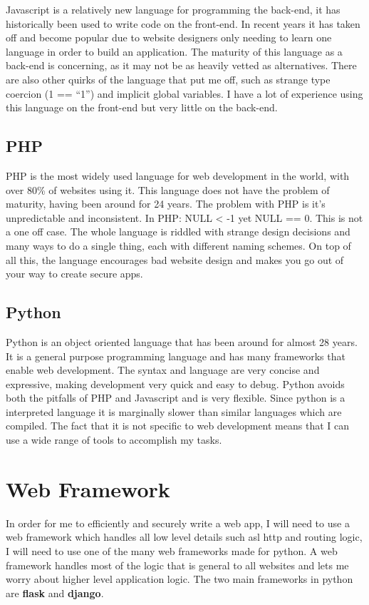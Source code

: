 \documentclass[a4paper,oneside,12pt,draft]{report}
\begin{document}
	Javascript is a relatively new language for programming the back-end, it has historically been used to write code on the front-end. In recent years it has taken off and become popular due to website designers only needing to learn one language in order to build an application. The maturity of this language as a back-end is concerning, as it may not be as heavily vetted as alternatives. There are also other quirks of the language that put me off, such as strange type coercion (1 == “1”) and implicit global variables. I have a lot of experience using this language on the front-end but very little on the back-end.

	\subsection{PHP}
	PHP is the most widely used language for web development in the world, with over 80\% of websites using it. This language does not have the problem of maturity, having been around for 24 years. The problem with PHP is it’s unpredictable and inconsistent. In PHP: NULL < -1 yet NULL == 0. This is not a one off case. The whole language is riddled with strange design decisions and many ways to do a single thing, each with different naming schemes. On top of all this, the language encourages bad website design and makes you go out of your way to create secure apps.

	\subsection{Python}
	Python is an object oriented language that has been around for almost 28 years. It is a general purpose programming language and has many frameworks that enable web development. The syntax and language are very concise and expressive, making development very quick and easy to debug. Python avoids both the pitfalls of PHP and Javascript and is very flexible. Since python is a interpreted language it is marginally slower than similar languages which are compiled. The fact that it is not specific to web development means that I can use a wide range of tools to accomplish my tasks.

	\section{Web Framework}
	In order for me to efficiently and securely write a web app, I will need to use a web framework which handles all low level details such asl http and routing logic, I will need to use one of the many web frameworks made for python. A web framework handles most of the logic that is general to all websites and lets me worry about higher level application logic. The two main frameworks in python are \textbf{flask} and \textbf{django}.
\end{document}
